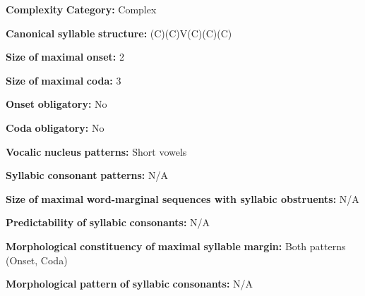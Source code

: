 \documentclass[output=paper]{langsci/langscibook}
\begin{document}
\begin{styleBody}
\textbf{Complexity} \textbf{Category:} Complex
\end{styleBody}

\begin{styleBody}
\textbf{Canonical} \textbf{syllable} \textbf{structure:} (C)(C)V(C)(C)(C) \citep[29-30]{Shiraishi2006}
\end{styleBody}

\begin{styleBody}
\textbf{Size} \textbf{of} \textbf{maximal} \textbf{onset:} 2
\end{styleBody}

\begin{styleBody}
\textbf{Size} \textbf{of} \textbf{maximal} \textbf{coda:} 3
\end{styleBody}

\begin{styleBody}
\textbf{Onset} \textbf{obligatory:} No
\end{styleBody}

\begin{styleBody}
\textbf{Coda} \textbf{obligatory:} No
\end{styleBody}

\begin{styleBody}
\textbf{Vocalic} \textbf{nucleus} \textbf{patterns:} Short vowels
\end{styleBody}

\begin{styleBody}
\textbf{Syllabic} \textbf{consonant} \textbf{patterns:} N/A
\end{styleBody}

\begin{styleBody}
\textbf{Size} \textbf{of} \textbf{maximal} \textbf{word{}-marginal sequences with syllabic obstruents:} N/A
\end{styleBody}

\begin{styleBody}
\textbf{Predictability} \textbf{of} \textbf{syllabic} \textbf{consonants:} N/A
\end{styleBody}

\begin{styleBody}
\textbf{Morphological} \textbf{constituency} \textbf{of} \textbf{maximal} \textbf{syllable} \textbf{margin:} Both patterns (Onset, Coda)
\end{styleBody}

\begin{styleBody}
\textbf{Morphological} \textbf{pattern} \textbf{of} \textbf{syllabic} \textbf{consonants:} N/A
\end{styleBody}
\end{document}
